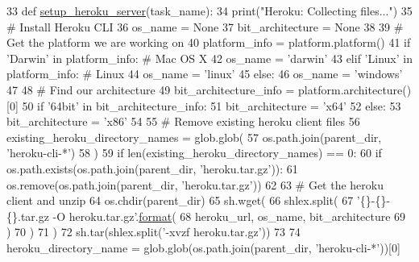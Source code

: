 \begin{DoxyCode}
33 \textcolor{keyword}{def }\hyperlink{namespaceparlai_1_1mturk_1_1core_1_1server__utils_af1c97e9b93a403e200ac75b87a51c3c1}{setup\_heroku\_server}(task\_name):
34     print(\textcolor{stringliteral}{"Heroku: Collecting files..."})
35     \textcolor{comment}{# Install Heroku CLI}
36     os\_name = \textcolor{keywordtype}{None}
37     bit\_architecture = \textcolor{keywordtype}{None}
38 
39     \textcolor{comment}{# Get the platform we are working on}
40     platform\_info = platform.platform()
41     \textcolor{keywordflow}{if} \textcolor{stringliteral}{'Darwin'} \textcolor{keywordflow}{in} platform\_info:  \textcolor{comment}{# Mac OS X}
42         os\_name = \textcolor{stringliteral}{'darwin'}
43     \textcolor{keywordflow}{elif} \textcolor{stringliteral}{'Linux'} \textcolor{keywordflow}{in} platform\_info:  \textcolor{comment}{# Linux}
44         os\_name = \textcolor{stringliteral}{'linux'}
45     \textcolor{keywordflow}{else}:
46         os\_name = \textcolor{stringliteral}{'windows'}
47 
48     \textcolor{comment}{# Find our architecture}
49     bit\_architecture\_info = platform.architecture()[0]
50     \textcolor{keywordflow}{if} \textcolor{stringliteral}{'64bit'} \textcolor{keywordflow}{in} bit\_architecture\_info:
51         bit\_architecture = \textcolor{stringliteral}{'x64'}
52     \textcolor{keywordflow}{else}:
53         bit\_architecture = \textcolor{stringliteral}{'x86'}
54 
55     \textcolor{comment}{# Remove existing heroku client files}
56     existing\_heroku\_directory\_names = glob.glob(
57         os.path.join(parent\_dir, \textcolor{stringliteral}{'heroku-cli-*'})
58     )
59     \textcolor{keywordflow}{if} len(existing\_heroku\_directory\_names) == 0:
60         \textcolor{keywordflow}{if} os.path.exists(os.path.join(parent\_dir, \textcolor{stringliteral}{'heroku.tar.gz'})):
61             os.remove(os.path.join(parent\_dir, \textcolor{stringliteral}{'heroku.tar.gz'}))
62 
63         \textcolor{comment}{# Get the heroku client and unzip}
64         os.chdir(parent\_dir)
65         sh.wget(
66             shlex.split(
67                 \textcolor{stringliteral}{'\{\}-\{\}-\{\}.tar.gz -O heroku.tar.gz'}.\hyperlink{namespaceparlai_1_1chat__service_1_1services_1_1messenger_1_1shared__utils_a32e2e2022b824fbaf80c747160b52a76}{format}(
68                     heroku\_url, os\_name, bit\_architecture
69                 )
70             )
71         )
72         sh.tar(shlex.split(\textcolor{stringliteral}{'-xvzf heroku.tar.gz'}))
73 
74     heroku\_directory\_name = glob.glob(os.path.join(parent\_dir, \textcolor{stringliteral}{'heroku-cli-*'}))[0]

\end{DoxyCode}
